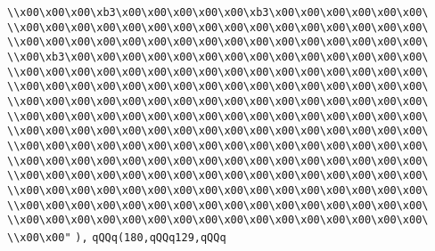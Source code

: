 \verb|\\x00\x00\x00\xb3\x00\x00\x00\x00\x00\xb3\x00\x00\x00\x00\x00\x00\|\newline
\verb|\\x00\x00\x00\x00\x00\x00\x00\x00\x00\x00\x00\x00\x00\x00\x00\x00\|\newline
\verb|\\x00\x00\x00\x00\x00\x00\x00\x00\x00\x00\x00\x00\x00\x00\x00\x00\|\newline
\verb|\\x00\xb3\x00\x00\x00\x00\x00\x00\x00\x00\x00\x00\x00\x00\x00\x00\|\newline
\verb|\\x00\x00\x00\x00\x00\x00\x00\x00\x00\x00\x00\x00\x00\x00\x00\x00\|\newline
\verb|\\x00\x00\x00\x00\x00\x00\x00\x00\x00\x00\x00\x00\x00\x00\x00\x00\|\newline
\verb|\\x00\x00\x00\x00\x00\x00\x00\x00\x00\x00\x00\x00\x00\x00\x00\x00\|\newline
\verb|\\x00\x00\x00\x00\x00\x00\x00\x00\x00\x00\x00\x00\x00\x00\x00\x00\|\newline
\verb|\\x00\x00\x00\x00\x00\x00\x00\x00\x00\x00\x00\x00\x00\x00\x00\x00\|\newline
\verb|\\x00\x00\x00\x00\x00\x00\x00\x00\x00\x00\x00\x00\x00\x00\x00\x00\|\newline
\verb|\\x00\x00\x00\x00\x00\x00\x00\x00\x00\x00\x00\x00\x00\x00\x00\x00\|\newline
\verb|\\x00\x00\x00\x00\x00\x00\x00\x00\x00\x00\x00\x00\x00\x00\x00\x00\|\newline
\verb|\\x00\x00\x00\x00\x00\x00\x00\x00\x00\x00\x00\x00\x00\x00\x00\x00\|\newline
\verb|\\x00\x00\x00\x00\x00\x00\x00\x00\x00\x00\x00\x00\x00\x00\x00\x00\|\newline
\verb|\\x00\x00\x00\x00\x00\x00\x00\x00\x00\x00\x00\x00\x00\x00\x00\x00\|\newline
\verb|\\x00\x00"|\newline
\verb|),|\newline
\verb|qQQq(180,qQQq129,qQQq|\newline
